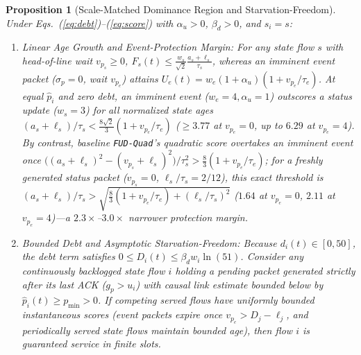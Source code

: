 \documentclass[journal]{IEEEtran}
\newtheorem{proposition}{Proposition}
\begin{document}
\begin{proposition}[Scale-Matched Dominance Region and Starvation-Freedom]
\label{prop:scale}
Under Eqs.~(\ref{eq:debt})--(\ref{eq:score}) with $\alpha_u > 0$, $\beta_d > 0$, and $s_i{=}s$:
\begin{enumerate}
\item[(i)] \emph{Linear Age Growth and Event-Protection Margin:} For any state flow $s$ with head-of-line wait $v_{p_s} \ge 0$, $F_s(t) \le \frac{w_s}{\sqrt{2}}\frac{a_s + \ell_s}{\tau_s}$, whereas an imminent event packet ($\sigma_p{=}0$, wait $v_{p_e}$) attains $U_e(t) = w_e(1{+}\alpha_u)(1{+}v_{p_e}/\tau_e)$. At equal $\hat{p}_i$ and zero debt, an imminent event ($w_e{=}4, \alpha_u{=}1$) outscores a status update ($w_s{=}3$) for all normalized state ages $(a_s{+}\ell_s)/\tau_s < \frac{8\sqrt{2}}{3}(1{+}v_{p_e}/\tau_e)$ ($\ge 3.77$ at $v_{p_e}{=}0$, up to $6.29$ at $v_{p_e}{=}4$). By contrast, baseline \texttt{FUD-Quad}'s quadratic score overtakes an imminent event once $\big((a_s{+}\ell_s)^2{-}(v_{p_s}{+}\ell_s)^2\big)/\tau_s^2 > \frac{8}{3}(1{+}v_{p_e}/\tau_e)$; for a freshly generated status packet ($v_{p_s}{=}0$, $\ell_s/\tau_s{=}2/12$), this exact threshold is $(a_s{+}\ell_s)/\tau_s > \sqrt{\frac{8}{3}(1{+}v_{p_e}/\tau_e) + (\ell_s/\tau_s)^2}$ ($1.64$ at $v_{p_e}{=}0$, $2.11$ at $v_{p_e}{=}4$)---a $2.3\times$--$3.0\times$ narrower protection margin.
\item[(ii)] \emph{Bounded Debt and Asymptotic Starvation-Freedom:} Because $d_i(t) \in [0, 50]$, the debt term satisfies $0 \le D_i(t) \le \beta_d w_i \ln(51)$. Consider any continuously backlogged state flow $i$ holding a pending packet generated strictly after its last ACK ($g_p > u_i$) with causal link estimate bounded below by $\hat{p}_i(t) \ge p_{\min} > 0$. If competing served flows have uniformly bounded instantaneous scores (event packets expire once $v_{p_e} > D_j{-}\ell_j$, and periodically served state flows maintain bounded age), then flow $i$ is guaranteed service in finite slots.
\end{enumerate}
\end{proposition}
\end{document}
